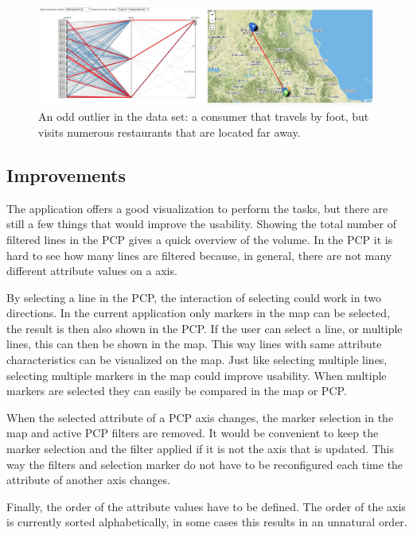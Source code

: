 \begin{figure}[h]
    \centering
    \captionsetup{justification=centering,margin=0.5cm}
    \includegraphics[width=.8\textwidth]{img/task2q5.jpg}
    \caption{An odd outlier in the data set: a consumer that travels by foot, but visits numerous restaurants that are located far away.}
    \label{fig:task2q5}
\end{figure}


\subsection{Improvements}\label{sec:improvements}

The application offers a good visualization to perform the tasks, but there are still a few things that would improve the usability.
Showing the total number of filtered lines in the PCP gives a quick overview of the volume.
In the PCP it is hard to see how many lines are filtered because, in general, there are not many different attribute values on a axis.

By selecting a line in the PCP, the interaction of selecting could work in two directions.
In the current application only markers in the map can be selected, the result is then also shown in the PCP.
If the user can select a line, or multiple lines, this can then be shown in the map.
This way lines with same attribute characteristics can be visualized on the map.
Just like selecting multiple lines, selecting multiple markers in the map could improve usability.
When multiple markers are selected they can easily be compared in the map or PCP.

When the selected attribute of a PCP axis changes, the marker selection in the map and active PCP filters are removed.
It would be convenient to keep the marker selection and the filter applied if it is not the axis that is updated.
This way the filters and selection marker do not have to be reconfigured each time the attribute of another axis changes.

Finally, the order of the attribute values have to be defined.
The order of the axis is currently sorted alphabetically, in some cases this results in an unnatural order.
